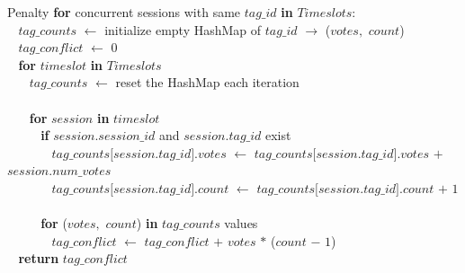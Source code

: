 \begin{tabbing}Penalty {\bf for} concurrent sessions with same $\textit{tag\_id}$ {\bf in} $\textit{Timeslots}$$:$\\
$~~~~$$\textit{tag\_counts}$ $\leftarrow$ initialize empty HashMap of $\textit{tag\_id}$ $\rightarrow$ ($\textit{votes}$$,$ $\textit{count}$)\\
$~~~~$$\textit{tag\_conflict}$ $\leftarrow$ $0$\\
$~~~~${\bf for} $\textit{timeslot}$ {\bf in} $\textit{Timeslots}$\\
$~~~~~~~~$$\textit{tag\_counts}$ $\leftarrow$ reset the HashMap each iteration\\
\\
$~~~~~~~~${\bf for} $\textit{session}$ {\bf in} $\textit{timeslot}$\\
$~~~~~~~~~~~~${\bf if} $\textit{session}$$.$$\textit{session\_id}$ and $\textit{session}$$.$$\textit{tag\_id}$ exist\\
$~~~~~~~~~~~~~~~~$$\textit{tag\_counts}$$[$$\textit{session}$$.$$\textit{tag\_id}$$].$$\textit{votes}$ $\leftarrow$ $\textit{tag\_counts}$$[$$\textit{session}$$.$$\textit{tag\_id}$$].$$\textit{votes}$ $+$ $\textit{session}$$.$$\textit{num\_votes}$\\
$~~~~~~~~~~~~~~~~$$\textit{tag\_counts}$$[$$\textit{session}$$.$$\textit{tag\_id}$$].$$\textit{count}$ $\leftarrow$ $\textit{tag\_counts}$$[$$\textit{session}$$.$$\textit{tag\_id}$$].$$\textit{count}$ $+$ $1$\\
\\
$~~~~~~~~~~~~${\bf for} ($\textit{votes}$$,$ $\textit{count}$) {\bf in} $\textit{tag\_counts}$ values\\
$~~~~~~~~~~~~~~~~$$\textit{tag\_conflict}$ $\leftarrow$ $\textit{tag\_conflict}$ $+$ $\textit{votes}$ $*$ ($\textit{count}$ $-$ $1$)\\
$~~~~${\bf return} $\textit{tag\_conflict}$\\
\end{tabbing}